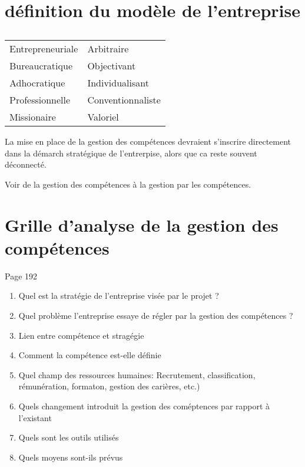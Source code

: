 \section{définition du modèle de l'entreprise}
\begin{table}
    \caption{}
    \label{tab: page 185}

    \begin{center}
        \begin{tabular}{ll}
             Entrepreneuriale & Arbitraire\\
             Bureaucratique & Objectivant \\
             Adhocratique & Individualisant\\
             Professionnelle & Conventionnaliste \\
             Missionaire & Valoriel \\
        \end{tabular}
    \end{center}
\end{table}



La mise en place de la gestion des compétences devraient s'inscrire directement dans la démarch stratégique de l'entrerpise, alors que ca reste souvent déconnecté. 

Voir de la gestion des compétences à la gestion par les compétences. 


\section{Grille d'analyse de la gestion des compétences}

Page 192
\begin{enumerate}
    \item Quel est la stratégie de l'entreprise visée par le projet ?
    \item Quel problème l'entreprise essaye de régler par la gestion des compétences ?
    \item Lien entre compétence et stragégie 
    \item Comment la compétence est-elle définie
    \item Quel champ des ressources humaines: Recrutement, classification, rémunération, formaton, gestion des carières, etc.)
    \item Quels changement introduit la gestion des coméptences par rapport à l'existant
    \item Quels sont les outils utilisés
    \item Quels moyens sont-ils prévus  
\end{enumerate}


